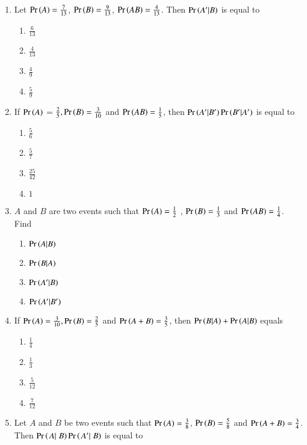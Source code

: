\begin{enumerate}[label=\thesubsection.\arabic*,ref=\thesubsection.\theenumi]
\item Let $\Pr\left(A\right) = \frac{7}{13}$, $\Pr\left(B\right) = \frac{9}{13}$, $\Pr\left(AB\right) = \frac{4}{13}$. Then $\Pr\left(A^{\prime}|B\right)$ is equal to
\begin{enumerate}
\setlength{\itemsep}{1ex}
\item $\frac{6}{13}$
\item $\frac{4}{13}$
\item $\frac{4}{9}$
\item $\frac{5}{9}$
\end{enumerate}
\solution

\item If $\Pr\left(A\right)$ = $\frac{2}{5}, \Pr\left(B\right) = \frac{3}{10}$ and $\Pr\left(AB\right) = \frac{1}{5}$, then $\Pr\left(A^{\prime}|B^{\prime}\right)\Pr\left(B^{\prime}|A^{\prime}\right)$ is equal to 
\begin{enumerate}
\setlength{\itemsep}{1ex}
\item 
$\frac{5}{6}$
\item 
$\frac{5}{7}$
\item 
$\frac{25}{42}$
\item 
$1$
\end{enumerate}
\solution

\item $A$ and $B$ are two events such that $\Pr\left(A\right)= \frac{1}{2}$ , $\Pr\left(B\right)= \frac{1}{3}$ and $\Pr\left(AB\right)= \frac{1}{4}$. Find
\begin{enumerate}
\item $\Pr\left(A|B\right)$  \item $\Pr\left(B|A\right)$  \item $\Pr\left(A^{\prime}|B\right)$  \item $\Pr\left(A^{\prime}|B^{\prime}\right)$
\end{enumerate}
\solution

\item If $\Pr\left(A\right) = \frac{3}{10}, \Pr\left(B\right) = \frac{2}{5}$ and $\Pr\left(A+B\right) = \frac{3}{5}$, then $\Pr\left( B | A\right) + \Pr\left( A | B\right) $ equals
\begin{enumerate}
\setlength{\itemsep}{1ex}
	\item $\frac{1}{4}$ 
	\item $\frac{1}{3}$ 
	\item $\frac{5}{12}$
	\item $\frac{7}{12}$
\end{enumerate}
\solution

\item Let $A$ and $B$ be two  events such that $\Pr\left(A\right) = \frac{3}{8}$, $\Pr\left(B\right) = \frac{5}{8}$ and $\Pr\left(A+B\right) = \frac{3}{4}$. Then $\Pr\left(\left.{A}|\right.{B}\right)\Pr\left(\left.{A^\prime} |\right.{B}\right)$ is equal to

\end{enumerate}
